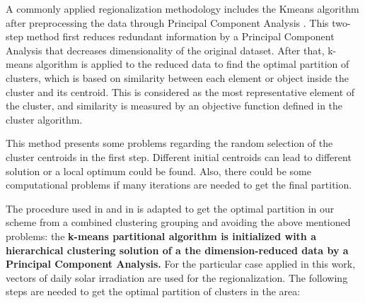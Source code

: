 
A commonly applied regionalization methodology includes the Kmeans algorithm after preprocessing the data through Principal Component Analysis \cite*{Ding2004}. This two-step method first reduces redundant information by a Principal Component Analysis that decreases dimensionality of the original dataset. After that, k-means algorithm is applied to the reduced data to find the optimal partition of clusters, which is based on similarity between each element or object inside the cluster and its centroid. This is considered as the most representative element of the cluster, and similarity is measured by an objective function defined in the cluster algorithm.

This method presents some problems regarding the random selection of the cluster centroids in the first step. Different initial centroids can lead to different solution or a local optimum could be found. Also, there could be some computational problems if many iterations are needed to get the final partition.

The procedure used in \cite{Argueso2011} and in \cite{Zagouras2014} is adapted to get the optimal partition in our scheme from a combined clustering grouping and avoiding the above mentioned problems: the \textbf{k-means partitional algorithm is initialized with a hierarchical clustering solution of a the dimension-reduced data by a Principal Component Analysis.} For the particular case applied in this work, vectors of daily solar irradiation are used for the regionalization. The following steps are needed to get the optimal partition of clusters in the area:

